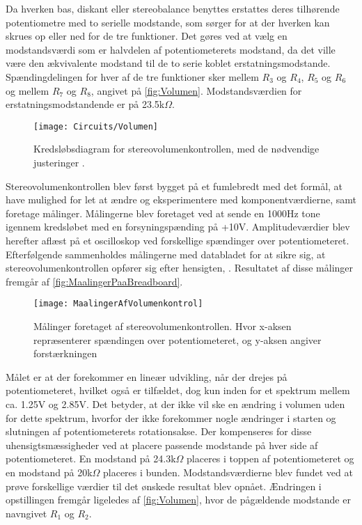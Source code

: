 Da hverken bas, diskant eller stereobalance benyttes erstattes deres tilhørende potentiometre med to serielle modstande, som sørger for at der hverken kan skrues op eller ned for de tre funktioner. Det gøres ved at vælg en modstandsværdi som er halvdelen af potentiometerets modstand, da det ville være den ækvivalente modstand til de to serie koblet erstatningsmodstande. Spændingdelingen for hver af de tre funktioner sker mellem $R_3$ og $R_4$, $R_5$ og $R_6$ og mellem $R_7$ og $R_8$, angivet på \autoref{fig:Volumen}. Modstandsværdien for erstatningsmodstandende er på 23.5k$\Omega$.   
%
\begin{figure}[H]
	\centering
	\texttt{[image: Circuits/Volumen]}
	\caption{Kredsløbsdiagram for stereovolumenkontrollen, med de nødvendige justeringer .}
	\label{fig:Volumen}
\end{figure}
\noindent
%
Stereovolumenkontrollen blev først bygget på et fumlebredt med det formål, at have mulighed for let at ændre og eksperimentere med komponentværdierne, samt foretage målinger. Målingerne blev foretaget ved at sende en 1000Hz tone igennem kredsløbet med en forsyningspænding på +10V. Amplitudeværdier blev herefter aflæst på et oscilloskop ved forskellige spændinger over potentiometeret. Efterfølgende sammenholdes målingerne med databladet for at sikre sig, at stereovolumenkontrollen opfører sig efter hensigten, \parencite[s. 9]{PDF:VolumeControl}. Resultatet af disse målinger fremgår af \autoref{fig:MaalingerPaaBreadboard}.
%
\begin{figure}[H]
	\centering
	\texttt{[image: MaalingerAfVolumenkontrol]}
	\caption{Målinger foretaget af stereovolumenkontrollen. Hvor x-aksen repræsenterer spændingen over potentiometeret, og y-aksen angiver forstærkningen}
	\label{fig:MaalingerPaaBreadboard}
\end{figure}
\noindent
%
Målet er at der forekommer en lineær udvikling, når der drejes på potentiometeret, hvilket også er tilfældet, dog kun inden for et spektrum mellem ca. 1.25V og 2.85V. Det betyder, at der ikke vil ske en ændring i volumen uden for dette spektrum, hvorfor der ikke forekommer nogle ændringer i starten og slutningen af potentiometerets rotationsakse. Der kompenseres for disse uhensigtsmæssigheder ved at placere passende modstande på hver side af potentiometeret. En modstand på 24.3k$\Omega$ placeres i toppen af potentiometeret og en modstand på 20k$\Omega$ placeres i bunden. Modstandsværdierne blev fundet ved at prøve forskellige værdier til det ønskede resultat blev opnået. Ændringen i opstillingen fremgår ligeledes af \autoref{fig:Volumen}, hvor de pågældende modstande er navngivet $R_1$ og $R_2$.\par
